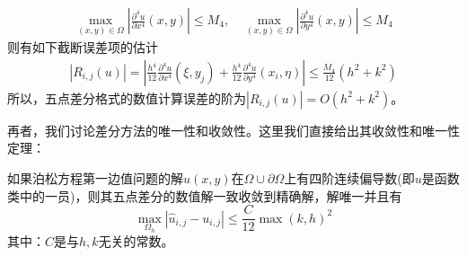             \begin{align*}
                \max_{(x,y) \in \Omega} \left| \frac{\partial^4 u}{\partial x^4}(x,y) \right| \leqslant M_4,\quad
                \max_{(x,y) \in \Omega} \left| \frac{\partial^4 u}{\partial y^4}(x,y) \right| \leqslant M_4
            \end{align*}
            则有如下截断误差项的估计
            \begin{align*}
                |R_{i,j}(u)| = \left|  \frac{h^4}{12} \frac{\partial^4 u}{\partial x^4}(\xi,y_j) + \frac{h^4}{12} \frac{\partial^4 u}{\partial y^4}(x_i,\eta) \right| \leqslant \frac{M_4}{12} (h^2+k^2)
            \end{align*}
            所以，五点差分格式的数值计算误差的阶为$|R_{i,j}(u)| = O(h^2+k^2)$。
            \par
            再者，我们讨论差分方法的唯一性和收敛性。这里我们直接给出其收敛性和唯一性定理：
            \begin{theorem}[差分法的收敛性]
            如果泊松方程第一边值问题的解$u(x,y)$在$\Omega \cup \partial \Omega$上有四阶连续偏导数(即$u$是函数类中的一员)，则其五点差分的数值解一致收敛到精确解，解唯一并且有
            \[
                \max_{\Omega_h} |\hat{u}_{i,j} - u_{i,j}| \leqslant \frac{C}{12} \max(k,h)^2
            \]
            其中：$C$是与$h,k$无关的常数。
            \end{theorem}

